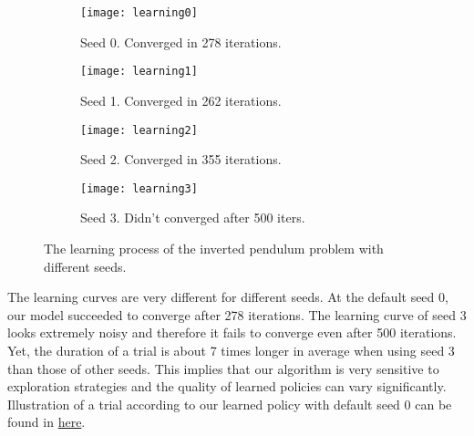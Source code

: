 \begin{answer}
\begin{figure}[H]
	\centering
	\begin{subfigure}[H]{0.45\linewidth}
		\texttt{[image: learning0]}
		\caption{Seed 0. Converged in 278 iterations.}
	\end{subfigure}
	\begin{subfigure}[H]{0.45\linewidth}
		\texttt{[image: learning1]}
		\caption{Seed 1. Converged in 262 iterations.}
	\end{subfigure}
	\begin{subfigure}[H]{0.45\linewidth}
		\texttt{[image: learning2]}
		\caption{Seed 2. Converged in 355 iterations.}
	\end{subfigure}
	\begin{subfigure}[H]{0.45\linewidth}
		\texttt{[image: learning3]}
		\caption{Seed 3. Didn't converged after 500 iters.}
	\end{subfigure}
	\caption{The learning process of the inverted pendulum problem with different seeds.}
\end{figure}
The learning curves are very different for different seeds. At the default seed 0, our model succeeded to converge after 278 iterations. The learning curve of seed 3 looks extremely noisy and therefore it fails to converge even after 500 iterations. Yet, the duration of a trial is about 7 times longer in average when using seed 3 than those of other seeds. This implies that our algorithm is very sensitive to exploration strategies and the quality of learned policies can vary significantly. Illustration of a trial according to our learned policy with default seed 0 can be found in \href{https://github.com/huyfam/CS229-solutions-summer-2019-2020/blob/main/psets/ps3/src/cartpole/simulation.gif}{here}.

\end{answer}
